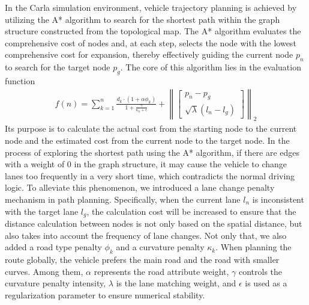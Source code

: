 \documentclass[lettersize,journal]{IEEEtran}
\begin{document}
In the Carla simulation environment, vehicle trajectory planning is achieved by utilizing the A* algorithm to search for the shortest path within the graph structure constructed from the topological map. 
The A* algorithm evaluates the comprehensive cost of nodes and, at each step, selects the node with the lowest comprehensive cost for expansion, thereby effectively guiding the current node $p_{n}$ to search for the target node $p_{g}$.
The core of this algorithm lies in the evaluation function 
\begin{align}
	f(n) = \sum_{k = 1}^{n} \frac{d_{k} \cdot\left(1+\alpha \phi_{k}\right)}{1 + \frac{\gamma}{\kappa_k + \epsilon}}+\left\|\left[\begin{array}{c}
		p_{n}-p_{g} \\
		\sqrt{\lambda}\left(l_{n}-l_{g}\right)
	\end{array}\right]\right\|_{2}
\end{align}
Its purpose is to calculate the actual cost from the starting node to the current node and the estimated cost from the current node to the target node. 
In the process of exploring the shortest path using the A* algorithm, if there are edges with a weight of 0 in the graph structure, it may cause the vehicle to change lanes too frequently in a very short time, which contradicts the normal driving logic. 
To alleviate this phenomenon, we introduced a lane change penalty mechanism in path planning. Specifically, when the current lane $l_{n}$ is inconsistent with the target lane $l_{g}$, the calculation cost will be increased to ensure that the distance calculation between nodes is not only based on the spatial distance, but also takes into account the frequency of lane changes. Not only that, we also added a road type penalty $\phi_{k}$ and a curvature penalty $\kappa_k$. When planning the route globally, the vehicle prefers the main road and the road with smaller curves. 
Among them, $\alpha$ represents the road attribute weight, $\gamma$ controls the curvature penalty intensity, $\lambda$ is the lane matching weight, and $\epsilon$ is used as a regularization parameter to ensure numerical stability.
\end{document}
